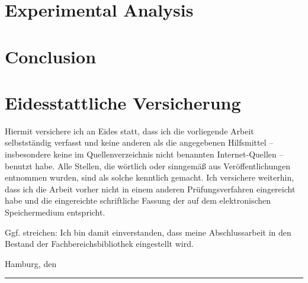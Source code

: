 \documentclass[
    fontsize=12pt,
    headings=small,
    parskip=half,           %
    bibliography=totoc,
    numbers=noenddot,       %
    open=any,               %
    ]{scrreprt}
\begin{document}
\chapter{Experimental Analysis}

\chapter{Conclusion}


\begin{raggedright}         %
  \printbibliography        %
  \label{sec:literaturverzeichnis}
\end{raggedright}


\appendix
\setcounter{figure}{0}
\renewcommand\thetable{A.\arabic{figure}}
\setcounter{table}{0}
\renewcommand\thetable{A.\arabic{table}}
\chapter*{Eidesstattliche Versicherung} %
\vspace{1cm}

%
Hiermit versichere ich an Eides statt, dass ich die vorliegende Arbeit
selbstständig verfasst und keine anderen als die angegebenen Hilfsmittel –
insbesondere keine im Quellenverzeichnis nicht benannten Internet-Quellen –
benutzt habe. Alle Stellen, die wörtlich oder sinngemäß aus Veröffentlichungen
entnommen wurden, sind als solche kenntlich gemacht. Ich versichere weiterhin,
dass ich die Arbeit vorher nicht in einem anderen Prüfungsverfahren eingereicht
habe und die eingereichte schriftliche Fassung der auf dem elektronischen
Speichermedium entspricht.

Ggf. streichen: Ich bin damit einverstanden, dass meine Abschlussarbeit in den
Bestand der Fachbereichsbibliothek eingestellt wird.

\makeatletter
Hamburg, den {\@date}
\makeatother

\vspace{2cm}
\rule{6cm}{0.25pt}\\
\makeatletter
{\@author} \par
\makeatother
\end{document}
